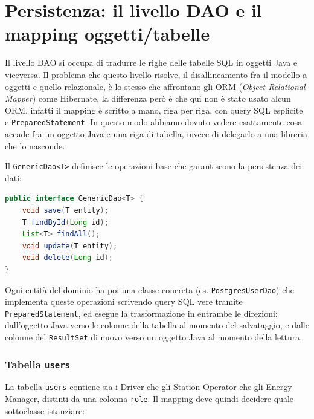 \section{Persistenza: il livello DAO e il mapping oggetti/tabelle}
\label{sec:dao}

Il livello DAO si occupa di tradurre le righe delle tabelle SQL in oggetti Java e viceversa. Il problema che questo livello risolve, il disallineamento fra il modello a oggetti e quello relazionale, è lo stesso che affrontano gli ORM (\textit{Object-Relational Mapper}) come Hibernate, la differenza però è che qui non è stato usato alcun ORM. infatti il mapping è scritto a mano, riga per riga, con query SQL esplicite e \texttt{PreparedStatement}. In questo modo abbiamo dovuto vedere esattamente cosa accade fra un oggetto Java e una riga di tabella, invece di delegarlo a una libreria che lo nasconde.

Il \texttt{GenericDao<T>} definisce le operazioni base che garantiscono la persistenza dei dati:

\vspace{0.3cm}
\noindent\begin{minipage}{\linewidth}
\begin{lstlisting}[language=Java, caption={Interfaccia DAO generica}]
public interface GenericDao<T> {
    void save(T entity);
    T findById(Long id);
    List<T> findAll();
    void update(T entity);
    void delete(Long id);
}
\end{lstlisting}
\end{minipage}
\vspace{0.3cm}

Ogni entità del dominio ha poi una classe concreta (es. \texttt{PostgresUserDao}) che implementa queste operazioni scrivendo query SQL vere tramite \texttt{PreparedStatement}, ed esegue la trasformazione in entrambe le direzioni: dall'oggetto Java verso le colonne della tabella al momento del salvataggio, e dalle colonne del \texttt{ResultSet} di nuovo verso un oggetto Java al momento della lettura.

\subsubsection{Tabella \texttt{users}}

La tabella \texttt{users} contiene sia i Driver che gli Station Operator che gli Energy Manager, distinti da una colonna \texttt{role}. Il mapping deve quindi decidere quale sottoclasse istanziare:

